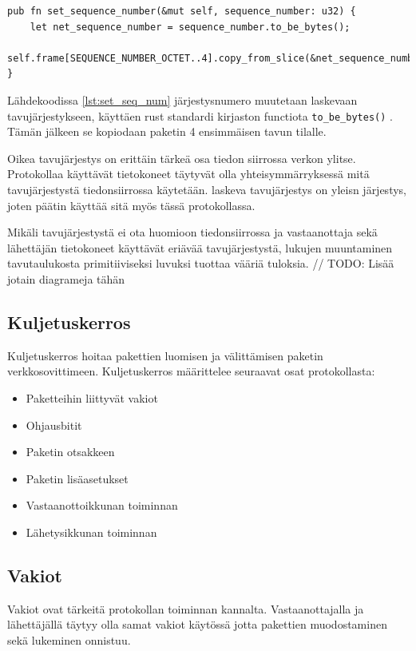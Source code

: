 \documentclass[a4paper,12pt]{article}
\begin{document}
\begin{lstlisting}[caption={Järjestusnumeron asettaminen pakettiin}, label={lst:set_seq_num}]
pub fn set_sequence_number(&mut self, sequence_number: u32) {
    let net_sequence_number = sequence_number.to_be_bytes();
    self.frame[SEQUENCE_NUMBER_OCTET..4].copy_from_slice(&net_sequence_number);
}
\end{lstlisting}

Lähdekoodissa \ref{lst:set_seq_num} järjestysnumero muutetaan laskevaan tavujärjestykseen, käyttäen rust standardi kirjaston functiota \lstinline{to_be_bytes()} \cite{rust_doc_u32}. Tämän jälkeen se kopiodaan paketin 4 ensimmäisen tavun tilalle. \par
Oikea tavujärjestys on erittäin tärkeä osa tiedon siirrossa verkon ylitse. Protokollaa käyttävät tietokoneet täytyvät olla yhteisymmärryksessä mitä tavujärjestystä tiedonsiirrossa käytetään. laskeva tavujärjestys on yleisn järjestys, joten päätin käyttää sitä myös tässä protokollassa. \par
Mikäli tavujärjestystä ei ota huomioon tiedonsiirrossa ja vastaanottaja sekä lähettäjän tietokoneet käyttävät eriävää tavujärjestystä, lukujen muuntaminen tavutaulukosta primitiiviseksi luvuksi tuottaa vääriä tuloksia.
// TODO: Lisää jotain diagrameja tähän
     
    \subsection{Kuljetuskerros}\label{subsec:kuljetuskerros}
    Kuljetuskerros hoitaa pakettien luomisen ja välittämisen paketin verkkosovittimeen. 
    Kuljetuskerros määrittelee seuraavat osat protokollasta:

    \begin{itemize}
        \item Paketteihin liittyvät vakiot
        \item Ohjausbitit
        \item Paketin otsakkeen
        \item Paketin lisäasetukset
        \item Vastaanottoikkunan toiminnan
        \item Lähetysikkunan toiminnan
    \end{itemize}

    \subsection{Vakiot}
    Vakiot ovat tärkeitä protokollan toiminnan kannalta. Vastaanottajalla ja lähettäjällä täytyy olla samat vakiot käytössä jotta pakettien muodostaminen sekä lukeminen onnistuu.
\end{document}
